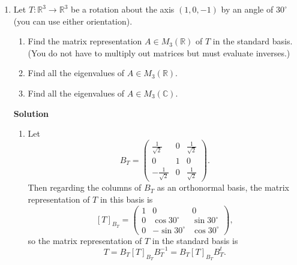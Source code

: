 \documentclass{article}
\newcommand{\matrixiiibyiii}[9]{\left( \begin{array}{ccc} #1 & #2 & #3 \\ #4 & #5 & #6 \\ #7 & #8 & #9 \end{array} \right)}
\begin{document}
\begin{enumerate}
\begin{enumerate}
\item \(W_1^{\circ} \cap W_2^{\circ} = (W_1 + W_2)^{\circ}\)

\item \((W_1 \cap W_2)^{\circ} = W_1^{\circ} + W_2^{\circ}\)

\end{enumerate}

(Note:  \(W_i^{\circ}\) is the annihilator of \(W_i\).)

{\bf Solution}

\begin{enumerate}
\item (S03.7)

\item The claim follows from the fact that \(W^{\circ\circ} = W\) for any subspace \(W\) of \(V\).

\end{enumerate}



\item Let \(T : \mathbb{R}^3 \to \mathbb{R}^3\) be a rotation about the axis \((1, 0, -1)\) by an angle of \(30^{\circ}\) (you can use either orientation).

\begin{enumerate}
\item Find the matrix representation \(A \in M_3(\mathbb{R})\) of \(T\) in the standard basis.  (You do not have to multiply out matrices but must evaluate inverses.)

\item Find all the eigenvalues of \(A \in M_3(\mathbb{R})\).

\item Find all the eigenvalues of \(A \in M_3(\mathbb{C})\).

\end{enumerate}

{\bf Solution}

\begin{enumerate}
\item Let
\[B_T = \matrixiiibyiii{ \frac{1}{\sqrt{2}}}{0}{\frac{1}{\sqrt{2}}}
                       {                  0}{1}{                 0}
                       {-\frac{1}{\sqrt{2}}}{0}{\frac{1}{\sqrt{2}}}.\]
Then regarding the columns of \(B_T\) as an orthonormal basis, the matrix representation of \(T\) in this basis is
\[[T]_{B_T} = \matrixiiibyiii{1}{               0}{              0}
                             {0}{ \cos 30^{\circ}}{\sin 30^{\circ}}
                             {0}{-\sin 30^{\circ}}{\cos 30^{\circ}},\]
so the matrix representation of \(T\) in the standard basis is
\[T = B_T [T]_{B_T} B_T^{-1}
    = B_T [T]_{B_T} B_T^t.\]


\end{enumerate}
\end{enumerate}
\end{document}
